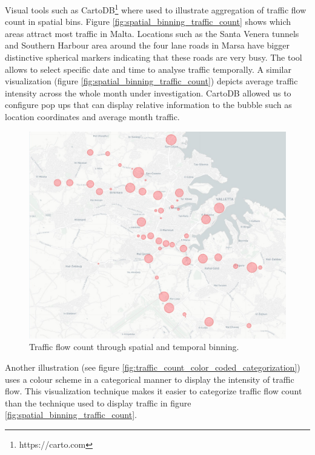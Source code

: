 \documentclass[12pt, a4paper]{report}
\theoremstyle{definition}
\theoremstyle{definition}%
\theoremstyle{definition}%
\theoremstyle{definition}%
\theoremstyle{definition}%
\theoremstyle{definition}%
\begin{document}
Visual tools such as CartoDB\footnote{https://carto.com} where used to illustrate aggregation of traffic flow count in spatial bins. Figure \ref{fig:spatial_binning_traffic_count} shows which areas attract most traffic in Malta. Locations such as the Santa Venera tunnels and Southern Harbour area around the four lane roads in Marsa have bigger distinctive spherical markers indicating that these roads are very busy. The tool allows to select specific date and time to analyse traffic temporally. A similar visualization (figure \ref{fig:spatial_binning_traffic_count}) depicts average traffic intensity across the whole month under investigation. CartoDB allowed us to configure pop ups that can display relative information to the bubble such as location coordinates and average month traffic.

\begin{figure}[!]	
	\includegraphics[scale=0.5]{traffic_month_average.jpg}
	\centering
	\caption{Traffic flow count through spatial and temporal binning. }
	\label{fig:traffic_month_average}
\end{figure}

Another illustration (see figure \ref{fig:traffic_count_color_coded_categorization}) uses a colour scheme in a categorical manner to display the intensity of traffic flow. This visualization technique makes it easier to categorize traffic flow count than the technique used to display traffic in figure \ref{fig:spatial_binning_traffic_count}.   
\end{document}
